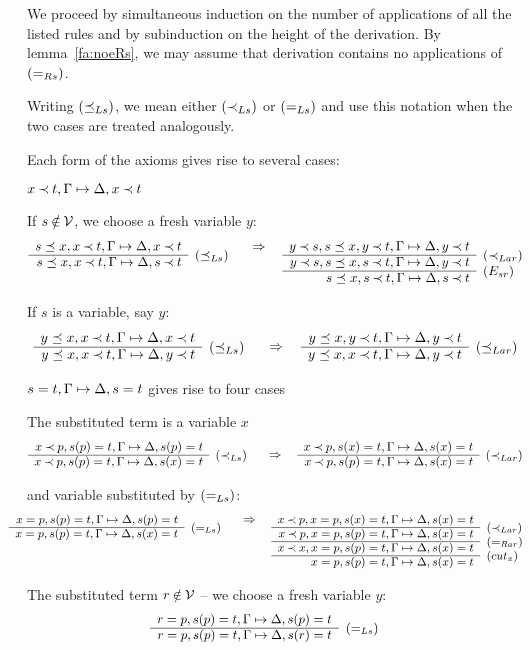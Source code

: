 \begin{PROOF}
We proceed by simultaneous induction on 
the number of applications of all the listed rules and by subinduction on the
height of the derivation. 
By lemma~\ref{fa:noeRs}, we may assume that derivation contains 
no applications of $(=_{Rs})$.

Writing $(\preceq_{Ls})$, we mean either $(\mathbin{\prec}_{Ls})$ or $(=_{Ls})$ and use this notation when the
two cases are treated analogously. 
\begin{LS}
\item Each form of the axioms gives rise to several cases:
\begin{LSA}
\item $x\mathbin{\prec} t,\Gamma\mathrel{\mapsto}\Delta, x\mathbin{\prec} t$
\begin{LSB}
\item If $s\not\in\Vars$, we choose a fresh variable $y:$
\[
\prar{
s\preceq x, x\Incl t, \GSD, x\Incl t \cl
s\preceq x, x\Incl t, \GSD, s\Incl t & \rabove{\pLs}
} \conv
\prar{
y\Incl s, s\preceq x, y\Incl t, \GSD, y\Incl t \cl
y\Incl s, s\preceq x, s\Incl t, \GSD, y\Incl t & \rabove{\iLar} \cl
     s\preceq x, s\Incl t, \GSD, s\Incl t & \rabove{\Esr}
}
\]
\item 
If $s$ is a variable, say $y$:
\[
\prarc{
y\preceq x, x\Incl t, \GSD, x\Incl t \cl
y\preceq x, x\Incl t, \GSD, y\Incl t & \rabove{\pLs}
} \conv
\prarc{
y\preceq x, y\Incl t, \GSD, y\Incl t \cl
y\preceq x, x\Incl t, \GSD, y\Incl t & \rabove{\pLar}
}
\]
\end{LSB}
\item $s=t,\Gamma\mathrel{\mapsto}\Delta,s=t$ gives rise to four cases
\begin{LSB}
\item The substituted term is a variable $x$
\[
\prarc{
x\Incl p, s(p)= t, \GSD, s(p)= t \cl
x\Incl p, s(p)= t, \GSD, s(x)= t & \rabove{\iLs}
} \conv
\prarc{
x\Incl p, s(x)= t, \GSD, s(x)= t \cl
x\Incl p, s(p)= t, \GSD, s(x)= t & \rabove{\iLar}
}
\]
\item and variable substituted by $(=_{Ls})$:
\[\sma{
\prar{
x= p, s(p)= t, \GSD, s(p)= t \cl
x= p, s(p)= t, \GSD, s(x)= t & \rabove{\eLs}
} \conv
\prar{
x\Incl p, x= p, s(x)= t, \GSD, s(x)= t \cl
x\Incl p, x= p, s(p)= t, \GSD, s(x)= t & \rabove{\iLar} \cl
x\Incl x, x= p, s(p)= t, \GSD, s(x)= t & \rabove{\eRar} \cl
 x= p, s(p)= t, \GSD, s(x)= t & \rabove{(cut_x)} 
} }
\]
\item The substituted term $r\not\in\Vars$ -- we choose a fresh variable $y:$
\[\sma{ \prar{
r=p, s(p)=t, \GSD, s(p)=t \cl
r=p, s(p)=t, \GSD, s(r)=t & \rabove{\eLs}
}}\]
\end{LSB}
\end{LSA}
\end{LS}
\end{PROOF}
